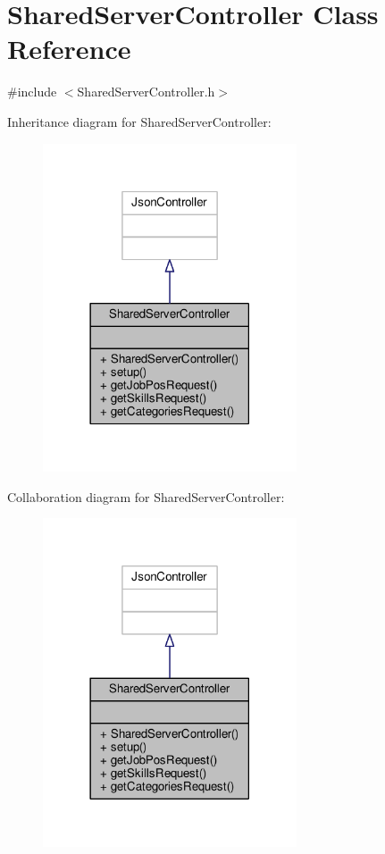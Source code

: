 \hypertarget{classSharedServerController}{}\section{Shared\+Server\+Controller Class Reference}
\label{classSharedServerController}


{\ttfamily \#include $<$Shared\+Server\+Controller.\+h$>$}



Inheritance diagram for Shared\+Server\+Controller\+:\nopagebreak
\begin{figure}[H]
\begin{center}
\leavevmode
\includegraphics[width=213pt]{d4/d6f/classSharedServerController__inherit__graph}
\end{center}
\end{figure}


Collaboration diagram for Shared\+Server\+Controller\+:\nopagebreak
\begin{figure}[H]
\begin{center}
\leavevmode
\includegraphics[width=213pt]{d5/dc7/classSharedServerController__coll__graph}
\end{center}
\end{figure}
